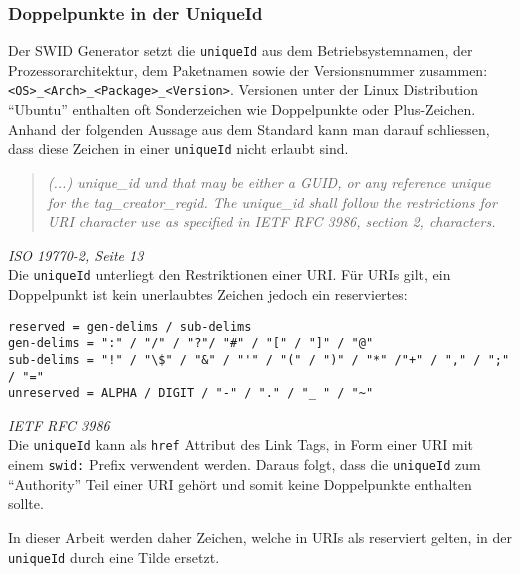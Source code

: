 \subsubsection{Doppelpunkte in der UniqueId} 
Der SWID Generator setzt die \texttt{uniqueId} aus dem Betriebsystemnamen, der
Prozessorarchitektur, dem Paketnamen sowie der Versionsnummer zusammen:
\texttt{<OS>\_<Arch>\_<Package>\_<Version>}. Versionen unter der Linux
Distribution \enquote{Ubuntu} enthalten oft Sonderzeichen wie Doppelpunkte oder
Plus-Zeichen. Anhand der folgenden Aussage aus dem Standard kann man darauf
schliessen, dass diese Zeichen in einer \texttt{uniqueId} nicht erlaubt sind.

\begin{quote}
\textit{(...) unique\_id und that may be either a GUID, or any reference unique
for the tag\_creator\_regid. The unique\_id shall follow the restrictions for
URI character use as specified in IETF RFC 3986, section 2, characters.}
\end{quote} 
\textit{ISO 19770-2\cite{iso19770-2}, Seite 13}\\

Die \texttt{uniqueId} unterliegt den Restriktionen einer URI. Für URIs gilt, ein
Doppelpunkt ist kein unerlaubtes Zeichen jedoch ein reserviertes:

\begin{verbatim} 
reserved = gen-delims / sub-delims 
gen-delims = ":" / "/" / "?"/ "#" / "[" / "]" / "@" 
sub-delims = "!" / "\$" / "&" / "'" / "(" / ")" / "*" /"+" / "," / ";" / "=" 
unreserved = ALPHA / DIGIT / "-" / "." / "_ " / "~"
\end{verbatim}
\textit{IETF RFC 3986\cite{berners2005rfc}}\\

Die \texttt{uniqueId} kann als \texttt{href} Attribut des Link Tags, in Form
einer URI mit einem \texttt{swid:} Prefix verwendent werden. Daraus folgt, dass
die \texttt{uniqueId} zum \enquote{Authority} Teil einer URI gehört und somit
keine Doppelpunkte enthalten sollte.

In dieser Arbeit werden daher Zeichen, welche in URIs als reserviert gelten, in
der \texttt{uniqueId} durch eine Tilde ersetzt.
